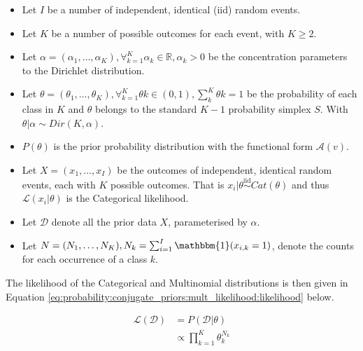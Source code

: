 \begin{itemize}
	\item Let $I$ be a number of independent, identical (iid) random events.
	
	\item Let $K$ be a number of possible outcomes for each event, with $K \geq 2$.
	
	\item Let $\alpha = (\alpha_{1}, \dots, \alpha_{K}), \forall_{k=1}^{K} \alpha_{k} \in \mathbb{R}, \alpha_{k} > 0$ be the concentration parameters to the Dirichlet distribution.
	
	\item Let $\theta = (\theta_{1}, \dots, \theta_{K}), \forall_{k=1}^{K} \theta{k} \in (0,1), \sum_{k}^{K} \theta{k} = 1$ be the probability of each class in $K$ and $\theta$ belongs to the standard $K-1$ probability simplex $S$. With $\theta | \alpha \sim Dir(K, \alpha)$. 
	
	\item $P(\theta)$ is the prior probability distribution with the functional form $\mathcal{A}(v)$.
	
	\item Let $X = (x_{1}, \dots, x_{I})$ be the outcomes of independent, identical random events, each with $K$ possible outcomes. That is $x_{i} | \theta \overset{\text{iid}}{\sim} Cat(\theta)$ and thus $\mathcal{L}(x_{i} \vert \theta)$ is the Categorical likelihood.
	
	\item Let $\mathcal{D}$ denote all the prior data $X$, parameterised by $\alpha$.
	
	\item Let $N = (N_{1}, \dots, N_{K}), N_{k} = \sum_{i=1}^{I} \mathbbm{1}(x_{i,k} = 1)$, denote the counts for each occurrence of a class $k$.
\end{itemize}

The likelihood of the Categorical and Multinomial distributions is then given in Equation \ref{eq:probability:conjugate_priors:mult_likelihood:likelihood} below.

\begin{equation}
    \label{eq:probability:conjugate_priors:mult_likelihood:likelihood}
    \begin{split}
    	\mathcal{L}(\mathcal{D}) &=  P(\mathcal{D} | \theta) \\
    	&\propto \prod_{k=1}^{K} \theta_{k}^{N_{k}}
    \end{split}
\end{equation}


